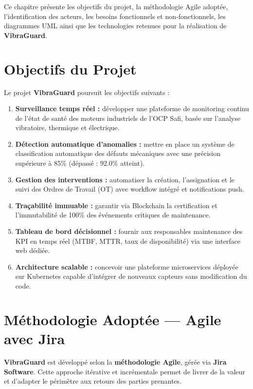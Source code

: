 \documentclass[12pt, a4paper, oneside]{report}
\newcommand{\projectname}{\textbf{VibraGuard}}
\begin{document}
Ce chapitre présente les objectifs du projet, la méthodologie Agile adoptée, l'identification des acteurs, les besoins fonctionnels et non-fonctionnels, les diagrammes UML ainsi que les technologies retenues pour la réalisation de \projectname{}.

\section{Objectifs du Projet}

Le projet \projectname{} poursuit les objectifs suivants :

\begin{enumerate}
  \item \textbf{Surveillance temps réel :} développer une plateforme de monitoring continu
  de l'état de santé des moteurs industriels de l'OCP Safi, basée sur l'analyse vibratoire, thermique et électrique.
  \item \textbf{Détection automatique d'anomalies :} mettre en place un système de
  classification automatique des défauts mécaniques avec une précision supérieure à 85\%
  (dépassé : 92.0\% atteint).
  \item \textbf{Gestion des interventions :} automatiser la création, l'assignation et le
  suivi des Ordres de Travail (OT) avec workflow intégré et notifications push.
  \item \textbf{Traçabilité immuable :} garantir via Blockchain la certification et
  l'immutabilité de 100\% des événements critiques de maintenance.
  \item \textbf{Tableau de bord décisionnel :} fournir aux responsables maintenance des KPI
  en temps réel (MTBF, MTTR, taux de disponibilité) via une interface web dédiée.
  \item \textbf{Architecture scalable :} concevoir une plateforme microservices déployée sur
  Kubernetes capable d'intégrer de nouveaux capteurs sans modification du code.
\end{enumerate}

\section{Méthodologie Adoptée — Agile avec Jira}

\projectname{} est développé selon la \textbf{méthodologie Agile}, gérée
via \textbf{Jira Software}. Cette approche itérative et incrémentale permet de livrer de la
valeur et d'adapter le périmètre aux retours des parties prenantes.
\end{document}
